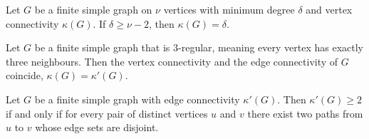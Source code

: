 \begin{theorem}
\label{SimpleGraph.vertexConnectivity_eq_minDegree_of_delta_ge}
Let $G$ be a finite simple graph on $\nu$ vertices with minimum degree $\delta$ and
vertex connectivity $\kappa(G)$. If $\delta \ge \nu - 2$, then $\kappa(G) = \delta$.
\end{theorem}

\begin{theorem}
\label{SimpleGraph.vertexConn_eq_edgeConn_of_threeRegular}
Let $G$ be a finite simple graph that is $3$-regular, meaning every vertex has exactly
three neighbours. Then the vertex connectivity and the edge connectivity of $G$
coincide, $\kappa(G) = \kappa'(G)$.
\end{theorem}

\begin{theorem}
\label{SimpleGraph.two_edge_connected_iff_two_edge_disjoint_paths}
Let $G$ be a finite simple graph with edge connectivity $\kappa'(G)$. Then $\kappa'(G)
\ge 2$ if and only if for every pair of distinct vertices $u$ and $v$ there exist two
paths from $u$ to $v$ whose edge sets are disjoint.
\end{theorem}
